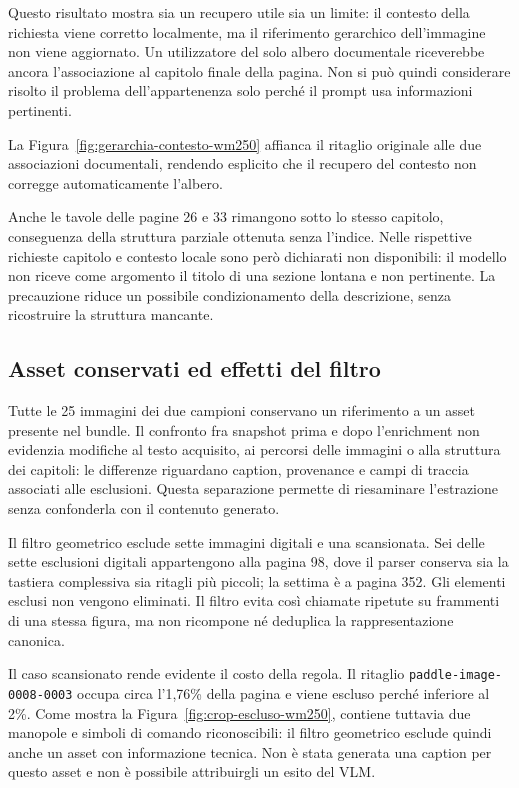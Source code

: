Questo risultato mostra sia un recupero utile sia un limite: il contesto della richiesta viene corretto localmente, ma il riferimento gerarchico dell'immagine non viene aggiornato. Un utilizzatore del solo albero documentale riceverebbe ancora l'associazione al capitolo finale della pagina. Non si può quindi considerare risolto il problema dell'appartenenza solo perché il prompt usa informazioni pertinenti.

La Figura~\ref{fig:gerarchia-contesto-wm250} affianca il ritaglio originale alle due associazioni documentali, rendendo esplicito che il recupero del contesto non corregge automaticamente l'albero.



Anche le tavole delle pagine 26 e 33 rimangono sotto lo stesso capitolo, conseguenza della struttura parziale ottenuta senza l'indice. Nelle rispettive richieste capitolo e contesto locale sono però dichiarati non disponibili: il modello non riceve come argomento il titolo di una sezione lontana e non pertinente. La precauzione riduce un possibile condizionamento della descrizione, senza ricostruire la struttura mancante.

\subsection{Asset conservati ed effetti del filtro}

Tutte le 25 immagini dei due campioni conservano un riferimento a un asset presente nel bundle. Il confronto fra snapshot prima e dopo l'enrichment non evidenzia modifiche al testo acquisito, ai percorsi delle immagini o alla struttura dei capitoli: le differenze riguardano caption, provenance e campi di traccia associati alle esclusioni. Questa separazione permette di riesaminare l'estrazione senza confonderla con il contenuto generato.

Il filtro geometrico esclude sette immagini digitali e una scansionata. Sei delle sette esclusioni digitali appartengono alla pagina 98, dove il parser conserva sia la tastiera complessiva sia ritagli più piccoli; la settima è a pagina 352. Gli elementi esclusi non vengono eliminati. Il filtro evita così chiamate ripetute su frammenti di una stessa figura, ma non ricompone né deduplica la rappresentazione canonica.

Il caso scansionato rende evidente il costo della regola. Il ritaglio \texttt{paddle-image-0008-0003} occupa circa l'1,76\% della pagina e viene escluso perché inferiore al 2\%. Come mostra la Figura~\ref{fig:crop-escluso-wm250}, contiene tuttavia due manopole e simboli di comando riconoscibili: il filtro geometrico esclude quindi anche un asset con informazione tecnica. Non è stata generata una caption per questo asset e non è possibile attribuirgli un esito del VLM.


